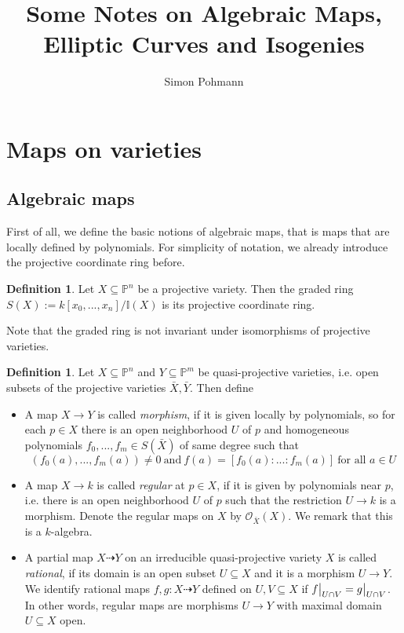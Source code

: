 \documentclass{scrartcl}
\title{Some Notes on Algebraic Maps, Elliptic Curves and Isogenies}
\author{Simon Pohmann}
\newcommand{\I}{\mathbb{I}}
\newcommand\restr[2]{{
    \left.\kern-\nulldelimiterspace
    #1
    \vphantom{\big|}
    \right|_{#2}
}}
\theoremstyle{definition}
\newtheorem{definition}[prop]{Definition}
\begin{document}
\maketitle

\tableofcontents

\section{Maps on varieties}

\subsection{Algebraic maps}
First of all, we define the basic notions of algebraic maps, that is maps that are locally defined by polynomials.
For simplicity of notation, we already introduce the projective coordinate ring before.
\begin{definition}
    Let $X \subseteq \mathbb{P}^n$ be a projective variety. 
    Then the graded ring $S(X) := k[x_0, ..., x_n] / \I(X)$ is its projective coordinate ring.
\end{definition}
Note that the graded ring is not invariant under isomorphisms of projective varieties.
\begin{definition}
    Let $X \subseteq \mathbb{P}^n$ and $Y \subseteq \mathbb{P}^m$ be quasi-projective varieties, i.e. open subsets of the projective varieties $\bar{X}, \bar{Y}$.
    Then define
    \begin{itemize}
        \item A map $X \to Y$ is called \emph{morphism}, if it is given locally by polynomials, so for each $p \in X$ there is an open neighborhood $U$ of $p$ and homogeneous polynomials $f_0, ..., f_m \in S(\bar{X})$ of same degree such that
        \begin{equation*}
            (f_0(a), ..., f_m(a)) \neq 0 \ \text{and} \ f(a) = [f_0(a) : ... : f_m(a)] \ \text{for all $a \in U$}
        \end{equation*}
        \item A map $X \to k$ is called \emph{regular} at $p \in X$, if it is given by polynomials near $p$, i.e. there is an open neighborhood $U$ of $p$ such that the restriction $U \to k$ is a morphism.
        Denote the regular maps on $X$ by $\mathcal{O}_{\bar{X}}(X)$.
        We remark that this is a $k$-algebra.
        \item A partial map $X \dashrightarrow Y$ on an irreducible quasi-projective variety $X$ is called \emph{rational}, if its domain is an open subset $U \subseteq X$ and it is a morphism $U \to Y$.
        We identify rational maps $f, g: X \dashrightarrow Y$ defined on $U, V \subseteq X$ if $\restr{f}{U \cap V} = \restr{g}{U \cap V}$.
        In other words, regular maps are morphisms $U \to Y$ with maximal domain $U \subseteq X$ open.
    \end{itemize}
\end{definition}
\end{document}

